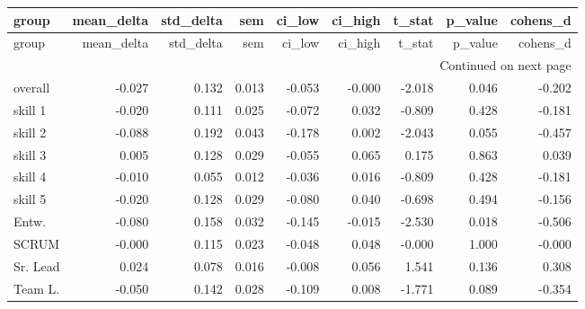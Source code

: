\begin{longtable}{lrrrrrrrr}
\toprule
group & mean\_delta & std\_delta & sem & ci\_low & ci\_high & t\_stat & p\_value & cohens\_d \\
\midrule
\endfirsthead
\toprule
group & mean\_delta & std\_delta & sem & ci\_low & ci\_high & t\_stat & p\_value & cohens\_d \\
\midrule
\endhead
\midrule
\multicolumn{9}{r}{Continued on next page} \\
\midrule
\endfoot
\bottomrule
\endlastfoot
overall & -0.027 & 0.132 & 0.013 & -0.053 & -0.000 & -2.018 & 0.046 & -0.202 \\
skill 1 & -0.020 & 0.111 & 0.025 & -0.072 & 0.032 & -0.809 & 0.428 & -0.181 \\
skill 2 & -0.088 & 0.192 & 0.043 & -0.178 & 0.002 & -2.043 & 0.055 & -0.457 \\
skill 3 & 0.005 & 0.128 & 0.029 & -0.055 & 0.065 & 0.175 & 0.863 & 0.039 \\
skill 4 & -0.010 & 0.055 & 0.012 & -0.036 & 0.016 & -0.809 & 0.428 & -0.181 \\
skill 5 & -0.020 & 0.128 & 0.029 & -0.080 & 0.040 & -0.698 & 0.494 & -0.156 \\
Entw. & -0.080 & 0.158 & 0.032 & -0.145 & -0.015 & -2.530 & 0.018 & -0.506 \\
SCRUM & -0.000 & 0.115 & 0.023 & -0.048 & 0.048 & -0.000 & 1.000 & -0.000 \\
Sr. Lead & 0.024 & 0.078 & 0.016 & -0.008 & 0.056 & 1.541 & 0.136 & 0.308 \\
Team L. & -0.050 & 0.142 & 0.028 & -0.109 & 0.008 & -1.771 & 0.089 & -0.354 \\
\end{longtable}
